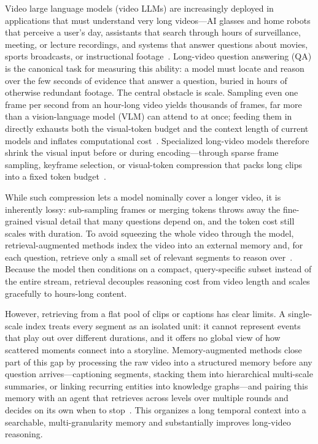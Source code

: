 \documentclass[letterpaper]{article} %
\begin{document}
Video large language models (video LLMs) are increasingly deployed in applications that must understand very long videos---AI glasses and home robots that perceive a user's day, assistants that search through hours of surveillance, meeting, or lecture recordings, and systems that answer questions about movies, sports broadcasts, or instructional footage~\citep{fu2024videomme,wang2024lvbench,zhou2024mlvu,tian2025egor1}. Long-video question answering (QA) is the canonical task for measuring this ability: a model must locate and reason over the few seconds of evidence that answer a question, buried in hours of otherwise redundant footage. The central obstacle is scale. Sampling even one frame per second from an hour-long video yields thousands of frames, far more than a vision-language model (VLM) can attend to at once; feeding them in directly exhausts both the visual-token budget and the context length of current models and inflates computational cost~\citep{qwen2_vl,gpt4o}. Specialized long-video models therefore shrink the visual input before or during encoding---through sparse frame sampling, keyframe selection, or visual-token compression that packs long clips into a fixed token budget~\citep{video_chatgpt,video_llava,llama_vid,chat_univi,longvu,sun2025videosalmonns}.

While such compression lets a model nominally cover a longer video, it is inherently lossy: sub-sampling frames or merging tokens throws away the fine-grained visual detail that many questions depend on, and the token cost still scales with duration. To avoid squeezing the whole video through the model, retrieval-augmented methods index the video into an external memory and, for each question, retrieve only a small set of relevant segments to reason over~\citep{lewis2020rag,karpukhin2020dpr,video_rag}. Because the model then conditions on a compact, query-specific subset instead of the entire stream, retrieval decouples reasoning cost from video length and scales gracefully to hours-long content.

However, retrieving from a flat pool of clips or captions has clear limits. A single-scale index treats every segment as an isolated unit: it cannot represent events that play out over different durations, and it offers no global view of how scattered moments connect into a storyline. Memory-augmented methods close part of this gap by processing the raw video into a structured memory before any question arrives---captioning segments, stacking them into hierarchical multi-scale summaries, or linking recurring entities into knowledge graphs---and pairing this memory with an agent that retrieves across levels over multiple rounds and decides on its own when to stop~\citep{moviechat,ma_lmm,fan2024videoagentmemory,worldmm,tian2025egor1,chen2025lvagent,wang2025avp}. This organizes a long temporal context into a searchable, multi-granularity memory and substantially improves long-video reasoning.
\end{document}
